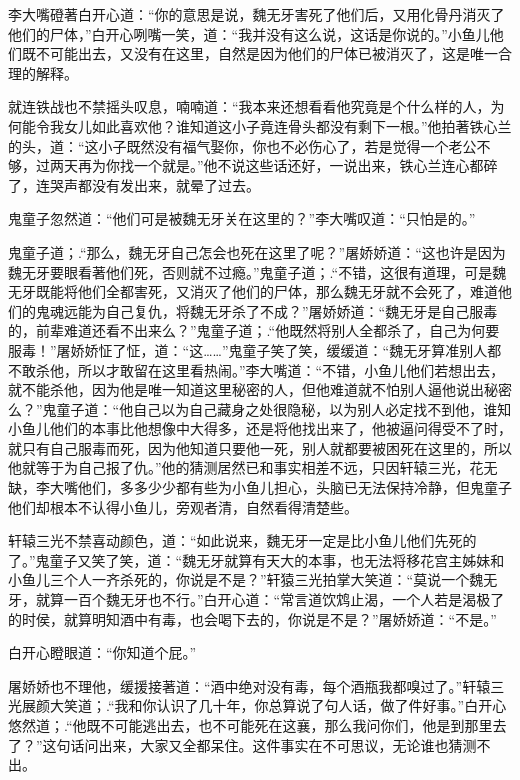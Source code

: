 \documentclass[12pt,oneside]{book}
\begin{document}
李大嘴磴著白开心道：``你的意思是说，魏无牙害死了他们后，又用化骨丹消灭了他们的尸体，''白开心咧嘴一笑，道：``我并没有这么说，这话是你说的。''小鱼儿他们既不可能出去，又没有在这里，自然是因为他们的尸体已被消灭了，这是唯一合理的解释。

就连铁战也不禁摇头叹息，喃喃道：``我本来还想看看他究竟是个什么样的人，为何能令我女儿如此喜欢他？谁知道这小子竟连骨头都没有剩下一根。''他拍著铁心兰的头，道：``这小子既然没有福气娶你，你也不必伤心了，若是觉得一个老公不够，过两天再为你找一个就是。''他不说这些话还好，一说出来，铁心兰连心都碎了，连哭声都没有发出来，就晕了过去。

鬼童子忽然道：``他们可是被魏无牙关在这里的？''李大嘴叹道：``只怕是的。''

鬼童子道；.``那么，魏无牙自己怎会也死在这里了呢？''屠娇娇道：``这也许是因为魏无牙要眼看著他们死，否则就不过瘾。''鬼童子道；.``不错，这很有道理，可是魏无牙既能将他们全都害死，又消灭了他们的尸体，那么魏无牙就不会死了，难道他们的鬼魂远能为自己复仇，将魏无牙杀了不成？''屠娇娇道：``魏无牙是自己服毒的，前辈难道还看不出来么？''鬼童子道；.``他既然将别人全都杀了，自己为何要服毒！''屠娇娇怔了怔，道：``这\ldots\ldots{}''鬼童子笑了笑，缓缓道：``魏无牙算准别人都不敢杀他，所以才敢留在这里看热闹。''李大嘴道：``不错，小鱼儿他们若想出去，就不能杀他，因为他是唯一知道这里秘密的人，但他难道就不怕别人逼他说出秘密么？''鬼童子道：``他自己以为自己藏身之处很隐秘，以为别人必定找不到他，谁知小鱼儿他们的本事比他想像中大得多，还是将他找出来了，他被逼问得受不了时，就只有自己服毒而死，因为他知道只要他一死，别人就都要被困死在这里的，所以他就等于为自己报了仇。''他的猜测居然已和事实相差不远，只因轩辕三光，花无缺，李大嘴他们，多多少少都有些为小鱼儿担心，头脑已无法保持冷静，但鬼童子他们却根本不认得小鱼儿，旁观者清，自然看得清楚些。

轩辕三光不禁喜动颜色，道：``如此说来，魏无牙一定是比小鱼儿他们先死的了。''鬼童子又笑了笑，道：``魏无牙就算有天大的本事，也无法将移花宫主姊妹和小鱼儿三个人一齐杀死的，你说是不是？''轩猿三光拍掌大笑道：``莫说一个魏无牙，就算一百个魏无牙也不行。''白开心道：``常言道饮鸩止渴，一个人若是渴极了的时侯，就算明知酒中有毒，也会喝下去的，你说是不是？''屠娇娇道：``不是。''

白开心瞪眼道：``你知道个屁。''

屠娇娇也不理他，缓援接著道：``酒中绝对没有毒，每个酒瓶我都嗅过了。''轩辕三光展颜大笑道；.``我和你认识了几十年，你总算说了句人话，做了件好事。''白开心悠然道；.``他既不可能逃出去，也不可能死在这襄，那么我问你们，他是到那里去了？''这句话问出来，大家又全都呆住。这件事实在不可思议，无论谁也猜测不出。
\end{document}
